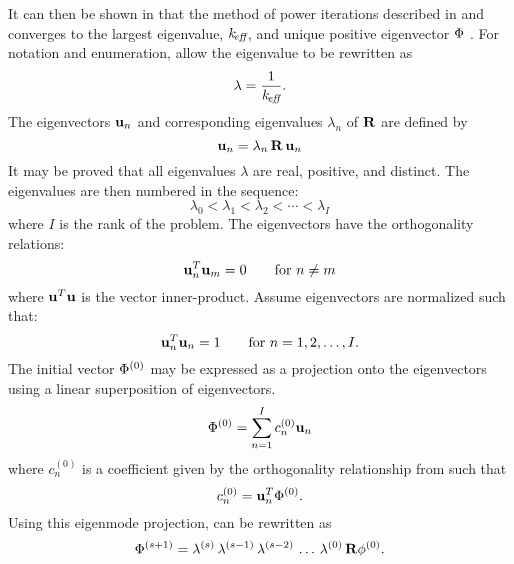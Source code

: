     It can then be shown in that the method of power iterations described in 
     and 
    converges to the largest eigenvalue, $k_{\!\mbox{\scriptsize \em eff}}$, and unique positive 
    eigenvector $\Phi$ \cite{nakamura}. For notation and enumeration, allow the 
    eigenvalue to be rewritten as
    \begin{equation}
      \label{eq:lambda}
      \lambda = \frac{1}{k_{\!\mbox{\scriptsize \em eff}}}.
    \end{equation}
    The eigenvectors $\mathbf{u}_n$ and
    corresponding eigenvalues $\lambda_n$ of $\mathbf{R}$ are defined by
    \begin{equation}
      \label{eq:eigen_definition}
      \mathbf{u}_n = \lambda_n \, \mathbf{R} \, \mathbf{u}_n
    \end{equation}
    It may be proved that all eigenvalues $\lambda$ are real, positive, and 
    distinct. The eigenvalues are then numbered in the sequence:
    \begin{equation}
      \label{eq:eigen_order}
      \lambda_0 < \lambda_1 < \lambda_2 < \cdots < \lambda_I
    \end{equation}
    where $I$ is the rank of the problem. The eigenvectors have the 
    orthogonality relations:
    \begin{equation}
      \label{eq:eigen_orthogonality}
      \mathbf{u}^T_n \mathbf{u}_m = 0  \qquad \text{for } n \ne m
    \end{equation}
    where $\mathbf{u}^T \mathbf{u}$ is the vector inner-product. Assume eigenvectors are
    normalized such that:
    \begin{equation}
      \label{eq:eigen_normalization}
      \mathbf{u}_n^T \mathbf{u}_n = 1 \qquad \text{for } n = 1, 2, \ldots, I.
    \end{equation}
    The initial vector $\Phi^{(0)}$ may be expressed as a projection onto the
    eigenvectors using a linear superposition of eigenvectors.
    \begin{equation}
      \label{eq:eigen_projection}
      \Phi^{(0)} = \sum_{n=1}^{I} c_n^{(0)} \mathbf{u}_n
    \end{equation}
    where $c_n^{(0)}$ is a coefficient given by the orthogonality relationship
    from  such that
    \begin{equation}
      \label{eq:eigen_cn}
      c_n^{(0)} = \mathbf{u}_n^T \Phi^{(0)}.
    \end{equation}
    Using this eigenmode projection,  can be
    rewritten as 
    \begin{equation}
      \label{eq:phi_expand_begin}
      \Phi^{(s+1)} = \lambda^{(s)} \, \lambda^{(s-1)} \, \lambda^{(s-2)} \, 
        \ldots \, \lambda^{(0)} \, \mathbf{R} \phi^{(0)}.
    \end{equation}
